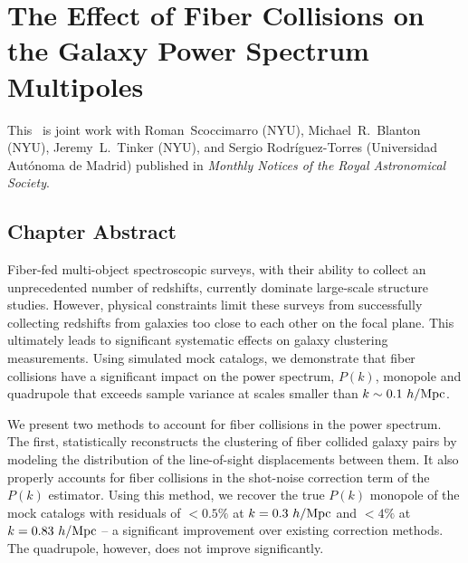 \renewcommand{\chapid}{obvs}

\chapter{The Effect of Fiber Collisions on the Galaxy Power Spectrum Multipoles}

This \paper\ is joint work with Roman~Scoccimarro (NYU), 
Michael~R.~Blanton (NYU), Jeremy~L.~Tinker (NYU), and Sergio Rodr\'{i}guez-Torres 
(Universidad Aut\'{o}noma de Madrid) published in \emph{Monthly Notices of the Royal
Astronomical Society}. 

\newcommand{\beqa}{\begin{eqnarray}}
\newcommand{\eeqa}{\end{eqnarray}}

\newcommand{\lexp}{\mathop{\langle}}
\newcommand{\rexp}{\mathop{\rangle}}
\newcommand{\rexpc}{\mathop{\rangle_c}}
\def\k{{\hbox{\BF k}}}
\def\x{{\hbox{\BF x}}}
\def\r{{\hbox{\BF r}}}
\def\s{{\hbox{\BF s}}}
\def\la{\mathrel{\mathpalette\fun <}}
\def\ga{\mathrel{\mathpalette\fun >}}
\def\fun#1#2{\lower3.6pt\vbox{\baselineskip0pt\lineskip.9pt
\ialign{$\mathsurround=0pt#1\hfill##\hfil$\crcr#2\crcr\sim\crcr}}}

\newcommand{\beq}{\begin{equation}}
\newcommand{\eeq}{\end{equation}}


\section{Chapter Abstract}
\qquad Fiber-fed multi-object spectroscopic surveys, with their ability to collect an unprecedented number of redshifts, currently dominate large-scale structure studies. However, physical constraints limit these surveys from successfully collecting redshifts from galaxies too close to each other on the focal plane. This ultimately leads to significant systematic effects on galaxy clustering measurements. Using simulated mock catalogs, we demonstrate that fiber collisions have a significant impact on the power spectrum, $P(k)$, monopole and quadrupole that exceeds sample variance at scales smaller than $k\sim0.1~h/{\rm Mpc}$.

\qquad We present two methods to account for fiber collisions in the power spectrum. The first, statistically reconstructs the clustering of fiber collided galaxy pairs by modeling the distribution of the line-of-sight displacements between them. It also properly accounts for fiber collisions in the shot-noise correction term of the $P(k)$ estimator. Using this method, we recover the true $P(k)$ monopole of the mock catalogs with residuals of $<0.5\%$ at $k=0.3~h/{\rm Mpc}$ and $<4\%$ at $k=0.83~h/{\rm Mpc}$ -- a significant improvement over existing correction methods. The quadrupole, however, does not improve significantly.

